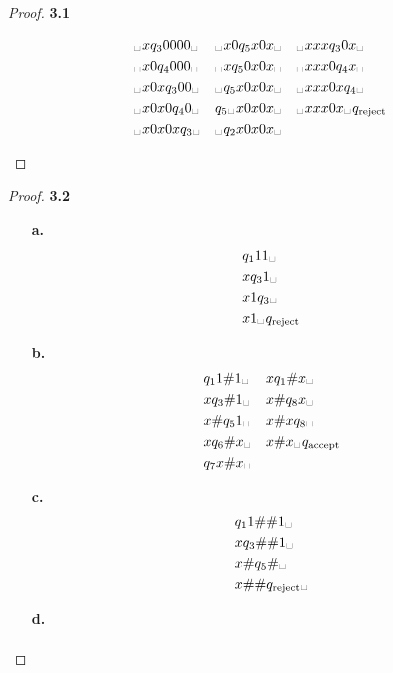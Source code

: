 \documentclass[11pt]{article}
\newcommand{\esp}{\text{\textvisiblespace}\hspace{0.1em}}
\theoremstyle{definition}
\begin{document}
\begin{proof}{\textbf{3.1}}
\begin{itemize}
\[\begin{aligned}
        &\esp x q_3 0 0 0 0\esp & &\esp x 0 q_5 x 0 x \esp & &\esp x x x q_3 0 x \esp \\
        &\esp x 0 q_4 0 0 0\esp & &\esp x q_5 0 x 0 x \esp & &\esp x x x 0 q_4 x \esp \\
        &\esp x 0 x q_3 0 0\esp & &\esp q_5 x 0 x 0 x \esp & &\esp x x x 0 x q_4 \esp \\
        &\esp x 0 x 0 q_4 0\esp & &q_5 \esp x 0 x 0 x \esp & &\esp x x x 0 x \esp q_{\text{reject}} \\
        &\esp x 0 x 0 x q_3\esp & &\esp q_2 x 0 x 0 x \esp \\
    \end{aligned}
    \]
\end{itemize}
\end{proof}
\begin{proof}{\textbf{3.2}}
    \begin{itemize}
        \item [\textbf{a.}]
        \begin{align*}
            &q_1 11 \esp\\
            &x q_3 1 \esp\\
            &x 1 q_3 \esp\\
            &x 1 \esp q_{\text{reject}}
        \end{align*}
        \item [\textbf{b.}]
        \[
        \begin{aligned}
            & q_1 1 \# 1 \esp     &  & x q_1 \# x \esp\\
            & x q_3 \# 1 \esp     &  & x \# q_8 x \esp\\
            & x \# q_5 1 \esp     &  & x \# x q_8 \esp\\
            & x q_6 \# x \esp     &  & x \# x \esp q_{\text{accept}}\\
            & q_7 x \# x \esp
        \end{aligned}
        \]
        \item [\textbf{c.}]
        \[
        \begin{aligned}
            & q_1 1 \# \# 1 \esp\\
            & x q_3 \# \# 1 \esp\\
            & x \# q_5 \# \esp\\
            & x \# \# q_{\text{reject}}\esp
        \end{aligned}
        \]
        \item [\textbf{d.}] 
        \[
        \begin{aligned}

\end{aligned}\]
\end{itemize}
\end{proof}
\end{document}
